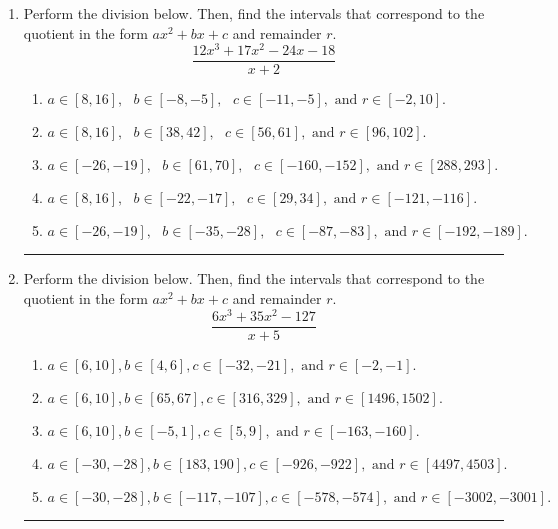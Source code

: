 \documentclass[14pt]{extbook}
\newcommand{\litem}[1]{\item#1\hspace*{-1cm}\rule{\textwidth}{0.4pt}}
\begin{document}
\begin{enumerate}
{\begin{enumerate}[label=\Alph*.]
\end{enumerate} }
\litem{
Perform the division below. Then, find the intervals that correspond to the quotient in the form $ax^2+bx+c$ and remainder $r$.\[ \frac{12x^{3} +17 x^{2} -24 x -18}{x + 2} \]\begin{enumerate}[label=\Alph*.]
\item \( a \in [8, 16], \text{   } b \in [-8, -5], \text{   } c \in [-11, -5], \text{   and   } r \in [-2, 10]. \)
\item \( a \in [8, 16], \text{   } b \in [38, 42], \text{   } c \in [56, 61], \text{   and   } r \in [96, 102]. \)
\item \( a \in [-26, -19], \text{   } b \in [61, 70], \text{   } c \in [-160, -152], \text{   and   } r \in [288, 293]. \)
\item \( a \in [8, 16], \text{   } b \in [-22, -17], \text{   } c \in [29, 34], \text{   and   } r \in [-121, -116]. \)
\item \( a \in [-26, -19], \text{   } b \in [-35, -28], \text{   } c \in [-87, -83], \text{   and   } r \in [-192, -189]. \)

\end{enumerate} }
\litem{
Perform the division below. Then, find the intervals that correspond to the quotient in the form $ax^2+bx+c$ and remainder $r$.\[ \frac{6x^{3} +35 x^{2} -127}{x + 5} \]\begin{enumerate}[label=\Alph*.]
\item \( a \in [6, 10], b \in [4, 6], c \in [-32, -21], \text{ and } r \in [-2, -1]. \)
\item \( a \in [6, 10], b \in [65, 67], c \in [316, 329], \text{ and } r \in [1496, 1502]. \)
\item \( a \in [6, 10], b \in [-5, 1], c \in [5, 9], \text{ and } r \in [-163, -160]. \)
\item \( a \in [-30, -28], b \in [183, 190], c \in [-926, -922], \text{ and } r \in [4497, 4503]. \)
\item \( a \in [-30, -28], b \in [-117, -107], c \in [-578, -574], \text{ and } r \in [-3002, -3001]. \)

\end{enumerate} }
\end{enumerate}
\end{document}
